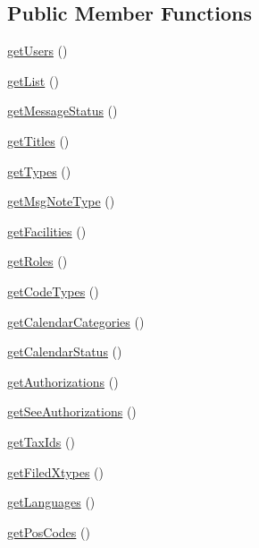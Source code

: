 \subsection*{\-Public \-Member \-Functions}
\begin{DoxyCompactItemize}
\item 
\hyperlink{class_combos_data_a0fc10b64683021b70c7eb95fb514c119}{get\-Users} ()
\item 
\hyperlink{class_combos_data_a5610c1415bd5fd946a42fd0fd4da4cff}{get\-List} ()
\item 
\hyperlink{class_combos_data_a09d27a7870dd890eacc9d88fab31998a}{get\-Message\-Status} ()
\item 
\hyperlink{class_combos_data_abb987aca7438fe863207fe3dfadb8c55}{get\-Titles} ()
\item 
\hyperlink{class_combos_data_a1e7fa771a9df3e495e38f12a85d3a286}{get\-Types} ()
\item 
\hyperlink{class_combos_data_a1051474171a1d3daecd6fb0e207d3399}{get\-Msg\-Note\-Type} ()
\item 
\hyperlink{class_combos_data_ac4aa1fc20da22e9c21781e8687fcead5}{get\-Facilities} ()
\item 
\hyperlink{class_combos_data_aa676cae5ee8d7fb6862a8724adc2660d}{get\-Roles} ()
\item 
\hyperlink{class_combos_data_af1b9ff2a0f6b445bf3150edfe7e13461}{get\-Code\-Types} ()
\item 
\hyperlink{class_combos_data_a6c113ad96ca8b54ec0167ecccf5f0b2c}{get\-Calendar\-Categories} ()
\item 
\hyperlink{class_combos_data_a7442e8154cc872b6e29db1afdaba18fa}{get\-Calendar\-Status} ()
\item 
\hyperlink{class_combos_data_a1cc9d4b90af3fd2d18449a607edb2c20}{get\-Authorizations} ()
\item 
\hyperlink{class_combos_data_a4a35941773d1bc2ee98811721fc7c20c}{get\-See\-Authorizations} ()
\item 
\hyperlink{class_combos_data_a20eee2f861c3bd5923aa5340eea44cb6}{get\-Tax\-Ids} ()
\item 
\hyperlink{class_combos_data_afda093a8a98909d5c22ddf2bef3a347b}{get\-Filed\-Xtypes} ()
\item 
\hyperlink{class_combos_data_ada2ef7bac2979b90332fe9a527c60667}{get\-Languages} ()
\item 
\hyperlink{class_combos_data_a050b23f05f60bfd5722dd80a844c4a1f}{get\-Pos\-Codes} ()
\end{DoxyCompactItemize}


